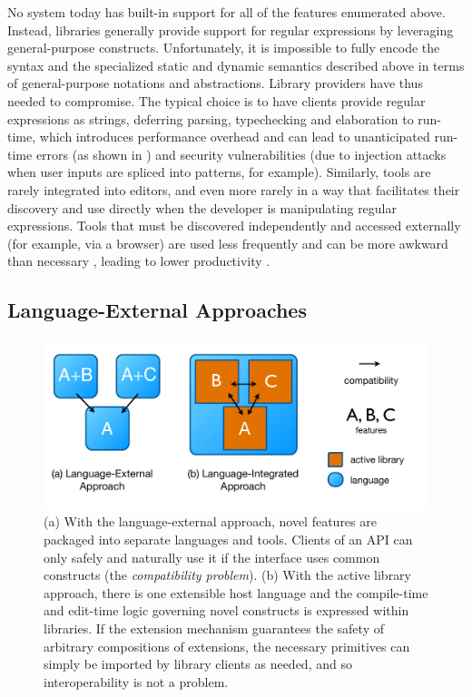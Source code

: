 No system today has built-in support for all of the features enumerated above. Instead, libraries generally provide support for regular expressions by leveraging  general-purpose constructs. Unfortunately, it is impossible to fully encode the syntax and the specialized static and dynamic semantics described above in terms of general-purpose notations and abstractions. Library providers have thus needed to compromise. The typical choice is to have clients provide regular expressions as strings, deferring parsing, typechecking and elaboration to run-time, which introduces performance overhead and can lead to unanticipated run-time errors (as shown in \cite{spishak2012type}) and security vulnerabilities (due to injection attacks when user inputs are spliced into patterns, for example). Similarly, tools are rarely integrated into editors, and even more rarely in a way that facilitates their discovery and use directly when the developer is manipulating regular expressions. Tools that must be discovered independently and accessed externally (for example, via a browser) are used less frequently  and can be more awkward than necessary \cite{Campbell:2008:DRT:1636642.1636651, Omar:2012:ACC:2337223.2337324}, leading to lower productivity \cite{Omar:2012:ACC:2337223.2337324}.

\subsection{Language-External Approaches}
\begin{figure}
\begin{center}
\includegraphics[scale=.45]{approaches.pdf}
\end{center}
\vspace{-20px}
\caption{\small (a) With the language-external approach, novel features are packaged into separate languages and tools. Clients of an API can only safely and naturally use it if the interface uses common constructs (the \emph{compatibility problem}). (b) With the active library approach, there is one extensible host language and the compile-time and edit-time logic governing novel constructs is expressed within libraries. If the extension mechanism guarantees the safety of arbitrary compositions of extensions, the necessary primitives can simply be imported by library clients as needed, and so interoperability is not a problem.}
\label{approaches}
\end{figure}

